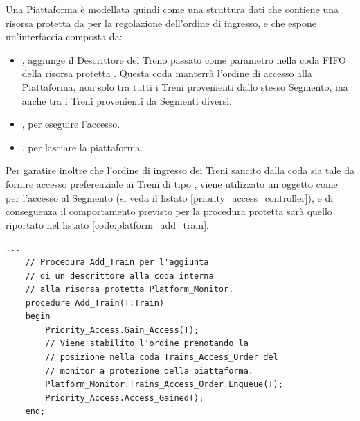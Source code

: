 \begin{description}
		Una Piattaforma è modellata quindi come una struttura dati che contiene una risorsa protetta da   per la regolazione dell'ordine di ingresso, e che espone un'interfaccia composta da:
		\begin{itemize}
			\item {}, aggiunge il Descrittore del Treno passato come parametro nella coda FIFO  della risorsa protetta . Questa coda manterrà l'ordine di accesso alla Piattaforma, non solo tra tutti i Treni provenienti dallo stesso Segmento, ma anche tra i Treni provenienti da Segmenti diversi.
			\item {}, per eseguire l'accesso.
			\item {}, per lasciare la piattaforma.
		\end{itemize}
		Per garatire inoltre che l'ordine di ingresso dei Treni sancito dalla coda  sia tale da fornire accesso preferenziale ai Treni di tipo , viene utilizzato un oggetto  come per l'accesso al Segmento (si veda il listato \ref{priority_access_controller}), e di conseguenza il comportamento previsto per la procedura protetta  sarà quello riportato nel listato \ref{code:platform_add_train}.
\begin{lstlisting}[caption=\small{Esempio di procedure \ttt{Add\_Train} per l'accesso alla Piattaforma.},label=code:platform_add_train]
	...
	// Procedura Add_Train per l'aggiunta
	// di un descrittore alla coda interna  
	// alla risorsa protetta Platform_Monitor.
	procedure Add_Train(T:Train)
	begin
		Priority_Access.Gain_Access(T);
		// Viene stabilito l'ordine prenotando la 
		// posizione nella coda Trains_Access_Order del
		// monitor a protezione della piattaforma.
		Platform_Monitor.Trains_Access_Order.Enqueue(T);
		Priority_Access.Access_Gained();
	end;
	

\end{lstlisting}
\end{description}
